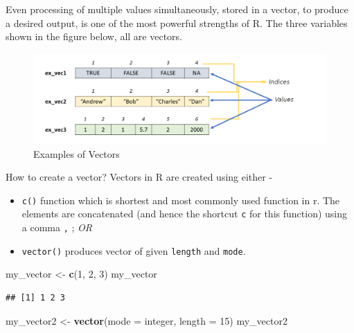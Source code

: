 \documentclass[
]{book}
\newenvironment{Shaded}{\begin{snugshade}}{\end{snugshade}}
\newcommand{\AttributeTok}[1]{\textcolor[rgb]{0.13,0.29,0.53}{#1}}
\newcommand{\DecValTok}[1]{\textcolor[rgb]{0.00,0.00,0.81}{#1}}
\newcommand{\FunctionTok}[1]{\textcolor[rgb]{0.13,0.29,0.53}{\textbf{#1}}}
\newcommand{\NormalTok}[1]{#1}
\newcommand{\OtherTok}[1]{\textcolor[rgb]{0.56,0.35,0.01}{#1}}
\newcommand{\StringTok}[1]{\textcolor[rgb]{0.31,0.60,0.02}{#1}}
\providecommand{\tightlist}{%
  \setlength{\itemsep}{0pt}\setlength{\parskip}{0pt}}
\begin{document}
Even processing of multiple values simultaneously, stored in a vector, to produce a desired output, is one of the most powerful strengths of R. The three variables shown in the figure below, all are vectors.

\begin{figure}

{\centering \includegraphics[width=0.99\linewidth]{images/example_vecs} 

}

\caption{Examples of Vectors}\label{fig:exvecs}
\end{figure}

How to create a vector? Vectors in R are created using either -

\begin{itemize}
\tightlist
\item
  \texttt{c()} function which is shortest and most commonly used function in r. The elements are concatenated (and hence the shortcut \texttt{c} for this function) using a comma \texttt{,} ; \emph{OR}
\item
  \texttt{vector()} produces vector of given \texttt{length} and \texttt{mode}.
\end{itemize}

\begin{Shaded}
\begin{Highlighting}[]
\NormalTok{my\_vector }\OtherTok{\textless{}{-}} \FunctionTok{c}\NormalTok{(}\DecValTok{1}\NormalTok{, }\DecValTok{2}\NormalTok{, }\DecValTok{3}\NormalTok{)}
\NormalTok{my\_vector}
\end{Highlighting}
\end{Shaded}

\begin{verbatim}
## [1] 1 2 3
\end{verbatim}

\begin{Shaded}
\begin{Highlighting}[]
\NormalTok{my\_vector2 }\OtherTok{\textless{}{-}} \FunctionTok{vector}\NormalTok{(}\AttributeTok{mode =} \StringTok{\textquotesingle{}integer\textquotesingle{}}\NormalTok{, }\AttributeTok{length =} \DecValTok{15}\NormalTok{)}
\NormalTok{my\_vector2}
\end{Highlighting}
\end{Shaded}
\end{document}
